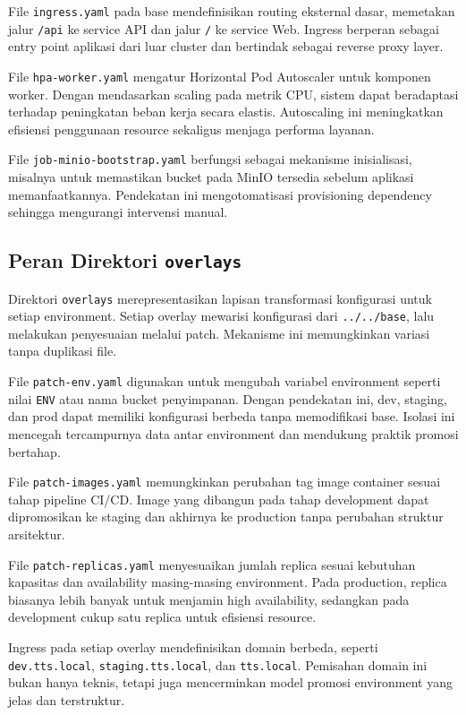 File \texttt{ingress.yaml} pada base mendefinisikan routing eksternal dasar, memetakan jalur \texttt{/api} ke service API dan jalur \texttt{/} ke service Web. Ingress berperan sebagai entry point aplikasi dari luar cluster dan bertindak sebagai reverse proxy layer.

File \texttt{hpa-worker.yaml} mengatur Horizontal Pod Autoscaler untuk komponen worker. Dengan mendasarkan scaling pada metrik CPU, sistem dapat beradaptasi terhadap peningkatan beban kerja secara elastis. Autoscaling ini meningkatkan efisiensi penggunaan resource sekaligus menjaga performa layanan.

File \texttt{job-minio-bootstrap.yaml} berfungsi sebagai mekanisme inisialisasi, misalnya untuk memastikan bucket pada MinIO tersedia sebelum aplikasi memanfaatkannya. Pendekatan ini mengotomatisasi provisioning dependency sehingga mengurangi intervensi manual.

\subsection*{Peran Direktori \texttt{overlays}}

Direktori \texttt{overlays} merepresentasikan lapisan transformasi konfigurasi untuk setiap environment. Setiap overlay mewarisi konfigurasi dari \texttt{../../base}, lalu melakukan penyesuaian melalui patch. Mekanisme ini memungkinkan variasi tanpa duplikasi file.

File \texttt{patch-env.yaml} digunakan untuk mengubah variabel environment seperti nilai \texttt{ENV} atau nama bucket penyimpanan. Dengan pendekatan ini, dev, staging, dan prod dapat memiliki konfigurasi berbeda tanpa memodifikasi base. Isolasi ini mencegah tercampurnya data antar environment dan mendukung praktik promosi bertahap.

File \texttt{patch-images.yaml} memungkinkan perubahan tag image container sesuai tahap pipeline CI/CD. Image yang dibangun pada tahap development dapat dipromosikan ke staging dan akhirnya ke production tanpa perubahan struktur arsitektur.

File \texttt{patch-replicas.yaml} menyesuaikan jumlah replica sesuai kebutuhan kapasitas dan availability masing-masing environment. Pada production, replica biasanya lebih banyak untuk menjamin high availability, sedangkan pada development cukup satu replica untuk efisiensi resource.

Ingress pada setiap overlay mendefinisikan domain berbeda, seperti \texttt{dev.tts.local}, \texttt{staging.tts.local}, dan \texttt{tts.local}. Pemisahan domain ini bukan hanya teknis, tetapi juga mencerminkan model promosi environment yang jelas dan terstruktur.

